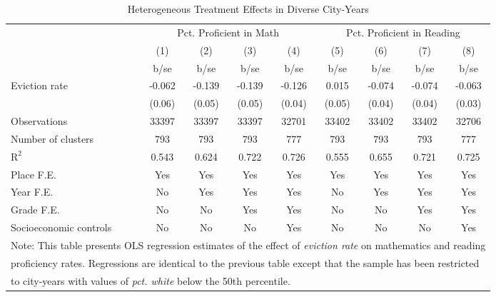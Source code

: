 \begin{table}[htbp]\centering
\def\sym#1{\ifmmode^{#1}\else\(^{#1}\)\fi}
\caption{Heterogeneous Treatment Effects in Diverse City-Years}
\begin{tabular}{l*{8}{c}}
\toprule
                    &\multicolumn{4}{c}{Pct. Proficient in Math}        &\multicolumn{4}{c}{Pct. Proficient in Reading}     \\\cmidrule(lr){2-5}\cmidrule(lr){6-9}
                    &\multicolumn{1}{c}{(1)}&\multicolumn{1}{c}{(2)}&\multicolumn{1}{c}{(3)}&\multicolumn{1}{c}{(4)}&\multicolumn{1}{c}{(5)}&\multicolumn{1}{c}{(6)}&\multicolumn{1}{c}{(7)}&\multicolumn{1}{c}{(8)}\\
                    &        b/se&        b/se&        b/se&        b/se&        b/se&        b/se&        b/se&        b/se\\
\midrule
Eviction rate       &      -0.062&      -0.139&      -0.139&      -0.126&       0.015&      -0.074&      -0.074&      -0.063\\
                    &      (0.06)&      (0.05)&      (0.05)&      (0.04)&      (0.05)&      (0.04)&      (0.04)&      (0.03)\\
\midrule
Observations        &       33397&       33397&       33397&       32701&       33402&       33402&       33402&       32706\\
Number of clusters  &         793&         793&         793&         777&         793&         793&         793&         777\\
$\text{R}^2$        &       0.543&       0.624&       0.722&       0.726&       0.555&       0.655&       0.721&       0.725\\
Place F.E.          &         Yes&         Yes&         Yes&         Yes&         Yes&         Yes&         Yes&         Yes\\
Year F.E.           &          No&         Yes&         Yes&         Yes&          No&         Yes&         Yes&         Yes\\
Grade F.E.          &          No&          No&         Yes&         Yes&          No&          No&         Yes&         Yes\\
Socioeconomic controls&          No&          No&          No&         Yes&          No&          No&          No&         Yes\\
\bottomrule
\multicolumn{9}{l}{\footnotesize Note: This table presents OLS regression estimates of the effect of \emph{eviction rate} on mathematics and reading}\\
\multicolumn{9}{l}{\footnotesize proficiency rates. Regressions are identical to the previous table except that the sample has been restricted}\\
\multicolumn{9}{l}{\footnotesize to city-years with values of \emph{pct. white} below the 50th percentile.}\\
\end{tabular}
\end{table}

